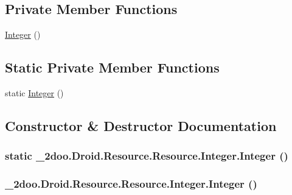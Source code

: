 \subsection*{Private Member Functions}
\begin{CompactItemize}
\item 
\hyperlink{class__2doo_1_1_droid_1_1_resource_1_1_integer_45a5269784641a7e6ba522ce9f1ed3dc}{Integer} ()
\end{CompactItemize}
\subsection*{Static Private Member Functions}
\begin{CompactItemize}
\item 
static \hyperlink{class__2doo_1_1_droid_1_1_resource_1_1_integer_264994465ea0fe8cfe2317416b41125b}{Integer} ()
\end{CompactItemize}


\subsection{Constructor \& Destructor Documentation}
\hypertarget{class__2doo_1_1_droid_1_1_resource_1_1_integer_264994465ea0fe8cfe2317416b41125b}{
\subsubsection[{Integer}]{\setlength{\rightskip}{0pt plus 5cm}static \_\-2doo.Droid.Resource.Resource.Integer.Integer ()}}
\label{class__2doo_1_1_droid_1_1_resource_1_1_integer_264994465ea0fe8cfe2317416b41125b}


\hypertarget{class__2doo_1_1_droid_1_1_resource_1_1_integer_45a5269784641a7e6ba522ce9f1ed3dc}{
\subsubsection[{Integer}]{\setlength{\rightskip}{0pt plus 5cm}\_\-2doo.Droid.Resource.Resource.Integer.Integer ()}}
\label{class__2doo_1_1_droid_1_1_resource_1_1_integer_45a5269784641a7e6ba522ce9f1ed3dc}




